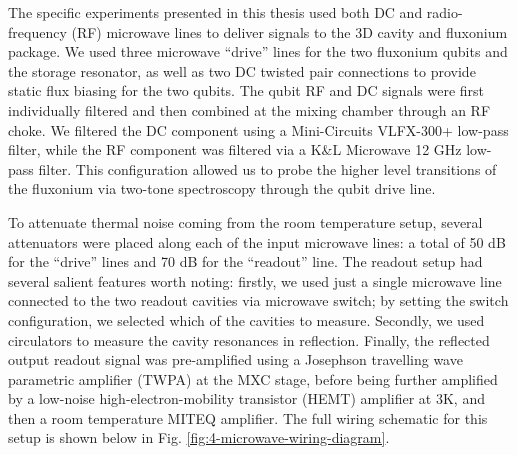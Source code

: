 The specific experiments presented in this thesis used both DC and radio-frequency (RF) microwave lines to deliver signals to the 3D cavity and fluxonium package. We used three microwave ``drive'' lines for the two fluxonium qubits and the storage resonator, as well as two DC twisted pair connections to provide static flux biasing for the two qubits. The qubit RF and DC signals were first individually filtered and then combined at the mixing chamber through an RF choke. We filtered the DC component using a Mini-Circuits VLFX-300+ low-pass filter, while the RF component was filtered via a K\&L Microwave 12 GHz low-pass filter. This configuration allowed us to probe the higher level transitions of the fluxonium via two-tone spectroscopy through the qubit drive line. 

To attenuate thermal noise coming from the room temperature setup, several attenuators were placed along each of the input microwave lines: a total of 50 dB for the ``drive'' lines and 70 dB for the ``readout'' line. The readout setup had several salient features worth noting: firstly, we used just a single microwave line connected to the two readout cavities via microwave switch; by setting the switch configuration, we selected which of the cavities to measure. Secondly, we used circulators to measure the cavity resonances in reflection. Finally, the reflected output readout signal was pre-amplified using a Josephson travelling wave parametric amplifier (TWPA) at the MXC stage, before being further amplified by a low-noise high-electron-mobility transistor (HEMT) amplifier at 3K, and then a room temperature MITEQ amplifier. The full wiring schematic for this setup is shown below in Fig. \ref{fig:4-microwave-wiring-diagram}. 

